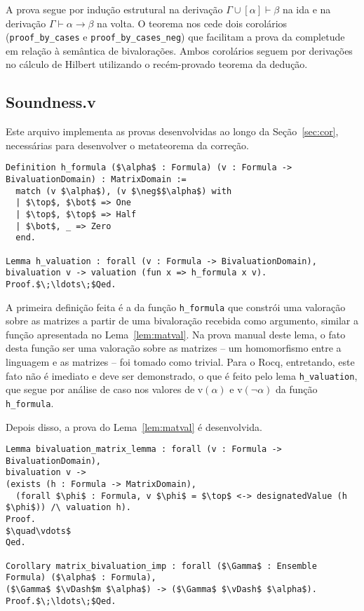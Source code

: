           A prova segue por indução estrutural na derivação $\Gamma \cup [\alpha] \vdash \beta$ na ida e na derivação $\Gamma \vdash \alpha \to \beta$ na volta. O teorema nos cede dois corolários (\texttt{proof\_by\_cases} e \texttt{proof\_by\_cases\_neg}) que facilitam a prova da completude em relação à semântica de bivalorações. Ambos corolários seguem por derivações no cálculo de Hilbert utilizando o recém-provado teorema da dedução.

        \subsection{Soundness.v}
        
        Este arquivo implementa as provas desenvolvidas ao longo da Seção~\ref{sec:cor}, necessárias para desenvolver o metateorema da correção.
        \begin{lstlisting}[name=Soundness, frame=single, language=coq]
Definition h_formula ($\alpha$ : Formula) (v : Formula -> BivaluationDomain) : MatrixDomain :=
  match (v $\alpha$), (v $\neg$$\alpha$) with
  | $\top$, $\bot$ => One
  | $\top$, $\top$ => Half
  | $\bot$, _ => Zero
  end.

Lemma h_valuation : forall (v : Formula -> BivaluationDomain),
bivaluation v -> valuation (fun x => h_formula x v).
Proof.$\;\ldots\;$Qed.
        \end{lstlisting}

        A primeira definição feita é a da função \texttt{h\_formula} que constrói uma valoração sobre as matrizes a partir de uma bivaloração recebida como argumento, similar a função apresentada no Lema~\ref{lem:matval}. Na prova manual deste lema, o fato desta função ser uma valoração sobre as matrizes {--} um homomorfismo entre a linguagem e as matrizes {--} foi tomado como trivial. Para o Rocq, entretando, este fato não é imediato e deve ser demonstrado, o que é feito pelo lema \texttt{h\_valuation}, que segue por análise de caso nos valores de v$(\alpha)$ e v$(\neg \alpha)$ da função \texttt{h\_formula}.

        Depois disso, a prova do Lema~\ref{lem:matval} é desenvolvida.

        \begin{lstlisting}[name=Soundness, frame=single, language=coq]
Lemma bivaluation_matrix_lemma : forall (v : Formula -> BivaluationDomain),
bivaluation v -> 
(exists (h : Formula -> MatrixDomain),
  (forall $\phi$ : Formula, v $\phi$ = $\top$ <-> designatedValue (h $\phi$)) /\ valuation h).
Proof. 
$\quad\vdots$
Qed.

Corollary matrix_bivaluation_imp : forall ($\Gamma$ : Ensemble Formula) ($\alpha$ : Formula), 
($\Gamma$ $\vDash$m $\alpha$) -> ($\Gamma$ $\vDash$ $\alpha$).
Proof.$\;\ldots\;$Qed.
        \end{lstlisting}

